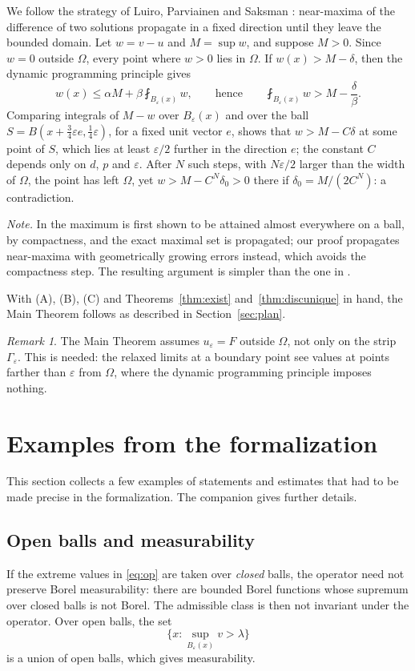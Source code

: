 \documentclass[11pt,reqno]{amsart}
\newcommand{\eps}{\varepsilon}
\theoremstyle{plain}
\theoremstyle{definition}
\theoremstyle{remark}
\newtheorem{remark}[theorem]{Remark}
\begin{document}
We follow the strategy of Luiro, Parviainen and Saksman
\cite[Theorem~2.2]{LPS14}: near-maxima of the difference of two solutions
propagate in a fixed direction until they leave the bounded domain. Let
$w = v - u$ and $M = \sup w$, and suppose $M > 0$. Since $w = 0$ outside
$\Omega$, every point where $w > 0$ lies in $\Omega$. If $w(x) > M - \delta$,
then the dynamic programming principle gives
\[
  w(x) \le \alpha M + \beta \fint_{B_\eps(x)} w,
  \qquad\text{hence}\qquad
  \fint_{B_\eps(x)} w > M - \frac{\delta}{\beta}.
\]
Comparing integrals of $M - w$ over $B_\eps(x)$ and over the ball
$S = B(x + \frac34\eps e, \frac14\eps)$, for a fixed unit vector $e$, shows
that $w > M - C\delta$ at some point of $S$, which lies at least $\eps/2$
further in the direction $e$; the constant $C$ depends only on $d$, $p$ and
$\eps$. After $N$ such steps, with $N\eps/2$ larger than the width of
$\Omega$, the point has left $\Omega$, yet $w > M - C^N\delta_0 > 0$ there if
$\delta_0 = M/(2C^N)$: a contradiction.

\smallskip
\noindent\emph{Note.} In \cite{LPS14} the maximum is first
shown to be attained almost everywhere on a ball, by compactness, and the
exact maximal set is propagated; our proof propagates near-maxima with
geometrically growing errors instead, which avoids the compactness step. The
resulting argument is simpler than the one in \cite{LPS14}.

With (A), (B), (C) and Theorems~\ref{thm:exist} and~\ref{thm:discunique} in
hand, the Main Theorem follows as described in Section~\ref{sec:plan}.

\begin{remark}
The Main Theorem assumes $u_\eps = F$ outside $\Omega$, not only on the strip
$\Gamma_\eps$. This is needed: the relaxed limits at a boundary point see
values at points farther than $\eps$ from $\Omega$, where the dynamic
programming principle imposes nothing.
\end{remark}

\section{Examples from the formalization}\label{sec:findings}

This section collects a few examples of statements and estimates that had
to be made precise in the formalization. The companion \cite[\S9]{MMcomp}
gives further details.

\subsection{Open balls and measurability}
If the extreme values in \eqref{eq:op} are taken over \emph{closed} balls,
the operator need not preserve Borel measurability: there are bounded Borel
functions whose supremum over closed balls is not Borel. The admissible class
is then not invariant under the operator.
Over open balls, the set
\[
  \{x : \sup_{B_\eps(x)} v > \lambda\}
\]
is a union of open balls, which gives measurability.
\end{document}

